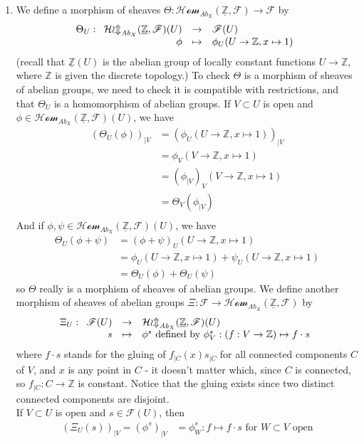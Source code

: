 \documentclass{article}
\newcommand{\Z}{\mathbb{Z}}
\newcommand{\Ab}{\mathit{Ab}}
\newcommand{\applic}[4]{\begin{array}[t]{rcl}
#1 & \to & #2 \\
#3 & \mapsto & #4
\end{array}}
\newcommand{\Fsheaf}{\mathscr{F}}
\newcommand{\sheafHom}{\mathcal{Hom}}
\begin{document}
\begin{enumerate}
    \item We define a morphism of sheaves $\Theta : \sheafHom_{\Ab_X}(\underline{\Z},\Fsheaf) \to \Fsheaf$ by
    \[\Theta_U : \applic{\sheafHom_{\Ab_X}(\underline{\Z},\Fsheaf)(U)}{\Fsheaf(U)}{\phi}{\phi_U(U\to \Z, x\mapsto 1)}\]
    (recall that $\underline{\Z}(U)$ is the abelian group of locally constant functions $U \to \Z$, where $\Z$ is given the discrete topology.) To check $\Theta$ is a morphism of sheaves of abelian groups, we need to check it is compatible with restrictions, and that $\Theta_U$ is a homomorphism of abelian groups. If $V\subset U$ is open and $\phi \in \sheafHom_{\Ab_X}(\underline{\Z},\Fsheaf)(U)$, we have
    \begin{align*}
        (\Theta_U (\phi))_{\mid V} & = (\phi_U (U\to \Z, x\mapsto 1))_{\mid V} \\
        & = \phi_V(V\to \Z, x\mapsto 1) \\
        & = (\phi_{\mid V})_V (V\to \Z, x\mapsto 1) \\
        & = \Theta_V(\phi_{\mid V}) \\
    \end{align*}
    And if $\phi, \psi \in \sheafHom_{\Ab_X}(\underline{\Z},\Fsheaf)(U)$, we have
    \begin{align*}
        \Theta_U (\phi + \psi) & = (\phi + \psi)_U (U\to \Z, x \mapsto 1) \\
        & = \phi_U (U\to \Z, x \mapsto 1) + \psi_U (U\to \Z, x \mapsto 1) \\
        & = \Theta_U (\phi) + \Theta_U(\psi)
    \end{align*}
    so $\Theta$ really is a morphism of sheaves of abelian groups. We define another morphism of sheaves of abelian groups $\Xi : \Fsheaf \to \sheafHom_{\Ab_X}(\underline{\Z},\Fsheaf)$ by
    \[\Xi_U : \applic{\Fsheaf(U)}{\sheafHom_{\Ab_X}(\underline{\Z},\Fsheaf)(U)}{s}{\phi^s \text{ defined by } \phi_V^s : (f : V \to \Z) \mapsto f \cdot s}\]
    where $f \cdot s$ stands for the gluing of $f_{\mid C}(x) s_{\mid C}$ for all connected components $C$ of $V$, and $x$ is any point in $C$ - it doesn't matter which, since $C$ is connected, so $f_{\mid C} : C \to \Z$ is constant. Notice that the gluing exists since two distinct connected components are disjoint. \\
    If $V \subset U$ is open and $s \in \Fsheaf(U)$, then
    \begin{align*}
        (\Xi_U (s))_{\mid V} = (\phi^s)_{\mid V} & = \phi_W^s : f \mapsto f \cdot s \text{ for $W \subset V$ open} \\

\end{align*}
\end{enumerate}
\end{document}
